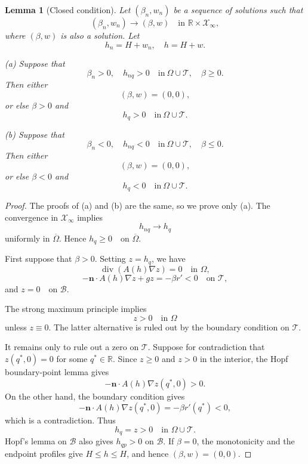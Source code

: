 \documentclass[12pt,letterpaper]{amsart}
\newtheorem{lemma}[theorem]{Lemma}
\numberwithin{equation}{section}
\def\R{{\mathbb R}}
\begin{document}
		
		\begin{lemma}[Closed condition]\label{lem:closed}
			{Let $(\beta_n,w_n)$ be a sequence of solutions such that}
			\[
			( \beta_n,w_n) \to (\beta,w) \quad \text{in }\R\times\mathscr X_{\infty},
			\]
			where \((\beta,w)\) is also a solution. Let
			\[
			h_n = H + w_n, \quad h = H + w.
			\]
			
			(a) Suppose that
			\[
			\beta_n > 0, \quad h_{nq} > 0 \quad \mathrm{in~} \Omega \cup \mathcal T, \quad \beta \geq 0.
			\]
			Then either
			\[
			{(\beta,w)=(0,0)},
			\]
			or else \(\beta > 0\) and
			\[
			h_q > 0 \quad \mathrm{in~} \Omega \cup\mathcal T.
			\]
			
			(b) Suppose that
			\[
			\beta_n < 0, \quad h_{nq} < 0 \quad \mathrm{in~} \Omega \cup\mathcal T, \quad \beta \leq 0.
			\]
			Then either
			\[
			{(\beta,w)=(0,0)},
			\]
			or else \(\beta < 0\) and
			\[
			h_q < 0 \quad \mathrm{in~} \Omega \cup\mathcal T.
			\]
		\end{lemma}
		\begin{proof}
			The proofs of (a) and (b) are the same, so we prove only (a). The convergence in \( \mathscr{X}_{\infty} \) implies
			\[
			h_{nq} \to h_q
			\]
			uniformly in \( \overline{\Omega} \). Hence
			$h_q \geq 0 \quad \text{on } \overline{\Omega}.$
			
			First suppose that \( \beta > 0 \). Setting \( z = h_q \), we have
			\[
			\operatorname{div}(A(h)\nabla z) = 0 \quad \text{in } \Omega,
			\]
			\[
			-\mathbf{n} \cdot A(h)\nabla z + gz = -\beta r' < 0 \quad \text{on } \mathcal T,
			\]
			and
			$z = 0 \quad \text{on } \mathcal B.$
			
			The strong maximum principle implies
			\[
			z > 0 \quad \text{in } \Omega
			\]
			unless \( z \equiv 0 \). The latter alternative is ruled out by the  boundary condition on \( \mathcal T \).
			
			It remains only to rule out a zero on {$\mathcal T$}. Suppose for contradiction that
			$z(q^*, 0) = 0$
			for some \( q^* \in \mathbb{R} \). Since \( z \geq 0 \) and \( z > 0 \) in the interior, the Hopf boundary-point lemma gives
			\[
			-\mathbf{n} \cdot A(h)\nabla z(q^*, 0) > 0.
			\]
			On the other hand, the boundary condition gives
			\[
			-\mathbf{n} \cdot A(h)\nabla z(q^*, 0) = -\beta r'(q^*) < 0,
			\]
			which is a contradiction. Thus
			\[
				h_q = z > 0 \quad {\text{in }\Omega\cup\mathcal T}.
			\]
			{Hopf's lemma on $\mathcal B$ also gives} $h_{qp}>0$ on $\mathcal B$.
			If $\beta=0$, the monotonicity and the endpoint profiles give $H\leq h\leq H$, and hence ${(\beta,w)=(0,0)}$.
		\end{proof}
		
\end{document}
